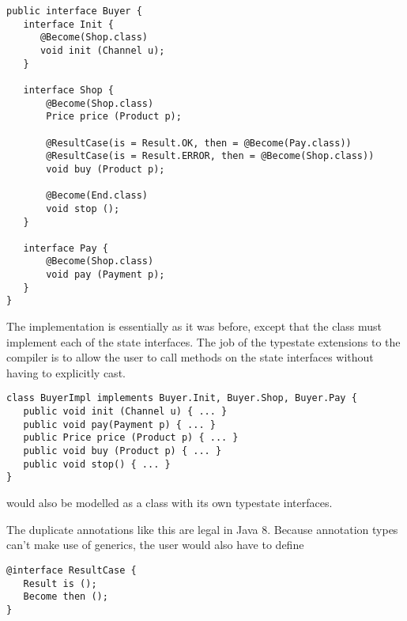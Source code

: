 \begin{lstlisting}
public interface Buyer {
   interface Init {
      @Become(Shop.class)
      void init (Channel u);
   }

   interface Shop {
       @Become(Shop.class)
       Price price (Product p);

       @ResultCase(is = Result.OK, then = @Become(Pay.class))
       @ResultCase(is = Result.ERROR, then = @Become(Shop.class))
       void buy (Product p);

       @Become(End.class)
       void stop ();
   }

   interface Pay {
       @Become(Shop.class)
       void pay (Payment p);
   }
}
\end{lstlisting}

\noindent The implementation is essentially as it was before, except
that the class  must implement each of the state
interfaces. The job of the typestate extensions to the compiler is to
allow the user to call methods on the state interfaces without having
to explicitly cast.

\begin{lstlisting}
class BuyerImpl implements Buyer.Init, Buyer.Shop, Buyer.Pay {
   public void init (Channel u) { ... }
   public void pay(Payment p) { ... }
   public Price price (Product p) { ... }
   public void buy (Product p) { ... }
   public void stop() { ... }
}
\end{lstlisting}

\noindent {} would also be modelled as a class with its own
typestate interfaces.

\noindent The duplicate annotations like this are legal in Java 8.
Because annotation types can't make use of generics, the user would
also have to define
\begin{lstlisting}
@interface ResultCase {
   Result is ();
   Become then ();
}
\end{lstlisting}

